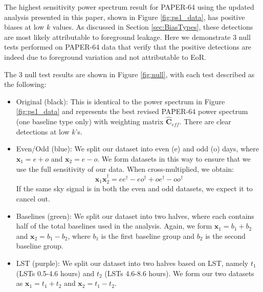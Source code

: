 \documentclass[preprint2,numberedappendix,tighten]{aastex6}  %
\begin{document}
The highest sensitivity power spectrum result for PAPER-64 using the updated analysis presented in this paper, shown in Figure \ref{fig:ps1_data}, has positive biases at low $k$ values. As discussed in Section \ref{sec:BiasTypes}, these detections are most likely attributable to foreground leakage. Here we demonstrate $3$ null tests performed on PAPER-64 data that verify that the positive detections are indeed due to foreground variation and not attributable to EoR.

The $3$ null test results are shown in Figure \ref{fig:null}, with each test described as the following:

\begin{itemize}
\item Original (black): This is identical to the power spectrum in Figure \ref{fig:ps1_data} and represents the best revised PAPER-64 power spectrum (one baseline type only) with weighting matrix $\hat{\textbf{C}}_{eff}$. There are clear detections at low $k$'s.
\item Even/Odd (blue): We split our dataset into even (e) and odd (o) days, where $\textbf{x}_{1} = e + o$ and $\textbf{x}_{2} = e - o$. We form datasets in this way to ensure that we use the full sensitivity of our data. When cross-multiplied, we obtain:
\begin{equation}
\textbf{x}_{1}\textbf{x}_{2}^{\dagger} = ee^{\dagger} - eo^{\dagger} + oe^{\dagger} - oo^{\dagger}
\end{equation}
If the same sky signal is in both the even and odd datasets, we expect it to cancel out.
\item Baselines (green): We split our dataset into two halves, where each contains half of the total baselines used in the analysis. Again, we form $\textbf{x}_{1} = b_{1} + b_{2}$ and $\textbf{x}_{2} = b_{1} - b_{2}$, where $b_{1}$ is the first baseline group and $b_{2}$ is the second baseline group.
\item LST (purple): We split our dataset into two halves based on LST, namely $t_{1}$ (LSTs 0.5-4.6 hours) and $t_{2}$ (LSTs 4.6-8.6 hours). We form our two datasets as $\textbf{x}_{1} = t_{1} + t_{2}$ and $\textbf{x}_{2} = t_{1} - t_{2}$.
\end{itemize}
\end{document}

